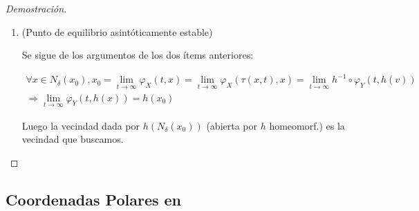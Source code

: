 \begin{proof}[Demostración]
\begin{enumerate}
		\begin{align*}
			[t \geq0 \land h(x) \in h(N_{\delta}(x_0)) ] &\Rightarrow h^{-1} \circ \varphi_Y^t \circ h (x) = \varphi_X^{\tau(x,t)} (x) \in N_{\epsilon}(x_0) \\
			&\Rightarrow  \varphi_Y^t \circ h (x)  \in h(N_{\epsilon}(x_0))
		\end{align*}
		
		De donde las vecindades (abiertas por $h$ homeomorf.) $h(N_{\delta}(x_0))$ cumplen para $\epsilon$ arbitrariamente pequeño (garantizándose que $h(N_{\epsilon}(x_0))$ base local por $h$ homeomorfismo).
		
		La inestabilidad viene dada del hecho de que si un campo tiene un punto de equilibrio inestable entonces éste no es estable. Si el otro tuviera un punto de equilibrio estable (no inestable) entonces se preservaría via equivalencia topológica al primero. Luego no se cumple.
		
		\item (Punto de equilibrio asintóticamente estable)
		
		Se sigue de los argumentos de los dos ítems anteriores:
		
		\begin{gather*}
			\forall x \in N_{\delta}(x_0), x_0 =\lim_{t \to \infty}\varphi_{X}(t,x)= \lim_{t \to \infty}\varphi_{X}(\tau(x,t),x) = \lim_{t \to \infty} h^{-1}\circ \varphi_Y(t, h(v))  \\
			\Rightarrow	\lim_{t \to \infty}  \varphi_Y(t, h(x)) = h(x_0) 
		\end{gather*}
		
		Luego la vecindad dada por $h(N_{\delta}(x_0))$ (abierta por $h$ homeomorf.) es la vecindad que buscamos.
	\end{enumerate}
\end{proof}



\subsection{Coordenadas Polares en }

